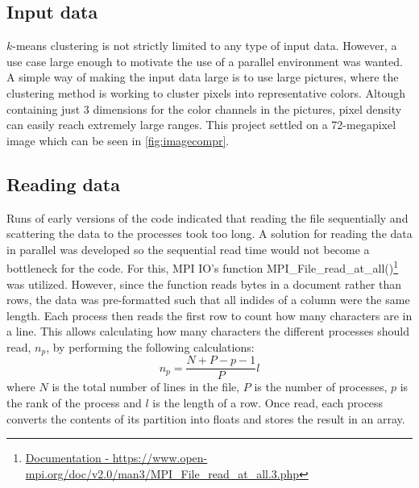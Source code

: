 
\subsection{Input data}

$k$-means clustering is not strictly limited to any type of input data.
However, a use case large enough to motivate the use of a parallel environment was wanted.
A simple way of making the input data large is to use large pictures,
where the clustering method is working to cluster pixels into representative colors.
Altough containing just 3 dimensions for the color channels in the pictures,
pixel density can easily reach extremely large ranges.
This project settled on a 72-megapixel image which can be seen in \cref{fig:imagecompr}.

\subsection{Reading data}

Runs of early versions of the code indicated that reading the file sequentially and scattering the data to the processes took too long. A solution for reading the data in parallel was developed so the sequential read time would not become a bottleneck for the code. For this, MPI IO's function MPI\_File\_read\_at\_all()\footnote{\url{Documentation - https://www.open-mpi.org/doc/v2.0/man3/MPI_File_read_at_all.3.php}} was utilized. However, since the function reads bytes in a document rather than rows, the data was pre-formatted such that all indides of a column were the same length. Each process then reads the first row to count how many characters are in a line. This allows calculating how many characters the different processes should read, $n_{p}$, by performing the following calculations:
\begin{equation}
    n_{p} =  \frac{N + P - p - 1}{P} l
\end{equation}
where $N$ is the total number of lines in the file, $P$ is the number of processes, $p$ is the rank of the process and $l$ is the length of a row. Once read, each process converts the contents of its partition into floats and stores the result in an array.
